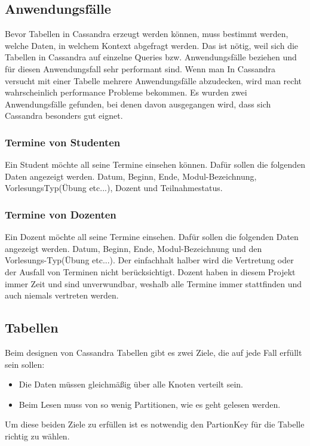 \newpage

\subsection{Anwendungsfälle}
Bevor Tabellen in Cassandra erzeugt werden können, muss bestimmt werden, welche Daten, in welchem Kontext abgefragt werden. Das ist nötig, weil sich die Tabellen in Cassandra auf einzelne Queries bzw. Anwendungsfälle beziehen und für diesen Anwendungsfall sehr performant sind. Wenn man In Cassandra versucht mit einer Tabelle mehrere Anwendungsfälle abzudecken, wird man recht wahrscheinlich performance Probleme bekommen. Es wurden zwei Anwendungsfälle gefunden, bei denen davon ausgegangen wird, dass sich Cassandra besonders gut eignet.

\vspace{12pt}

\subsubsection{Termine von Studenten}
Ein Student möchte all seine Termine einsehen können. 
Dafür sollen die folgenden Daten angezeigt werden. 
Datum, Beginn, Ende, Modul-Bezeichnung, VorlesungsTyp(Übung etc...), Dozent und Teilnahmestatus.

\vspace{12pt}

\subsubsection{Termine von Dozenten}
Ein Dozent möchte all seine Termine einsehen.
Dafür sollen die folgenden Daten angezeigt werden. 
Datum, Beginn, Ende, Modul-Bezeichnung und den Vorlesungs-Typ(Übung etc...).
Der einfachhalt halber wird die Vertretung oder der Ausfall von Terminen nicht berücksichtigt. Dozent haben in diesem Projekt immer Zeit und sind unverwundbar, weshalb alle Termine immer stattfinden und auch niemals vertreten werden.

\newpage

\subsection{Tabellen}
Beim designen von Cassandra Tabellen gibt es zwei Ziele, die auf jede Fall erfüllt sein sollen:
\begin{itemize}
	\item Die Daten müssen gleichmäßig über alle Knoten verteilt sein.
	\item Beim Lesen muss von so wenig Partitionen, wie es geht gelesen werden.
\end{itemize}
Um diese beiden Ziele zu erfüllen ist es notwendig den PartionKey für die Tabelle richtig zu wählen.

